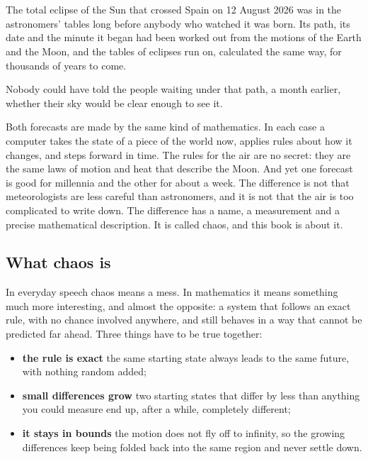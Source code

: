 
\chapter*{\lblIntroduction}
{}
\markboth{\lblIntroduction}{\lblIntroduction}

\noindent
The total eclipse of the Sun that crossed Spain on 12 August 2026 was in the
astronomers' tables long before anybody who watched it was born. Its path,
its date and the minute it began had been worked out from the motions of the
Earth and the Moon, and the tables of eclipses run on, calculated the same
way, for thousands of years to come.

Nobody could have told the people waiting under that path, a month
earlier, whether their sky would be clear enough to see it.

Both forecasts are made by the same kind of mathematics. In each case a
computer takes the state of a piece of the world now, applies rules about
how it changes, and steps forward in time. The rules for the air are no
secret: they are the same laws of motion and heat that describe the Moon.
And yet one forecast is good for millennia and the other for about a week.
The difference is not that meteorologists are less careful than
astronomers, and it is not that the air is too complicated to write down.
The difference has a name, a measurement and a precise mathematical
description. It is called chaos, and this book is about it.

\section*{What chaos is}

In everyday speech chaos means a mess. In mathematics it means something
much more interesting, and almost the opposite: a system that follows an
exact rule, with no chance involved anywhere, and still behaves in a way
that cannot be predicted far ahead. Three things have to be true together:

\begin{itemize}[leftmargin=1.4em, itemsep=2pt]
  \item \textbf{the rule is exact} \dash{} the same starting state always
        leads to the same future, with nothing random added;
  \item \textbf{small differences grow} \dash{} two starting states that
        differ by less than anything you could measure end up, after a
        while, completely different;
  \item \textbf{it stays in bounds} \dash{} the motion does not fly off to
        infinity, so the growing differences keep being folded back into
        the same region and never settle down.
\end{itemize}

